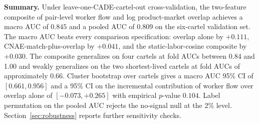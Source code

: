 \medskip

\noindent\textbf{Summary.} Under leave-one-CADE-cartel-out cross-validation, the two-feature composite of pair-level worker flow and log product-market overlap achieves a macro AUC of $0.845$ and a pooled AUC of $0.809$ on the six-cartel validation set. The macro AUC beats every comparison specification: overlap alone by $+0.111$, CNAE-match-plus-overlap by $+0.041$, and the static-labor-cosine composite by $+0.030$. The composite generalizes on four cartels at fold AUCs between 0.84 and 1.00 and weakly generalizes on the two shortest-lived cartels at fold AUCs of approximately 0.66. Cluster bootstrap over cartels gives a macro AUC 95\% CI of $[0.661, 0.956]$ and a 95\% CI on the incremental contribution of worker flow over overlap alone of $[-0.073, +0.265]$ with empirical $p$-value $0.104$. Label permutation on the pooled AUC rejects the no-signal null at the 2\% level. Section~\ref{sec:robustness} reports further sensitivity checks.
